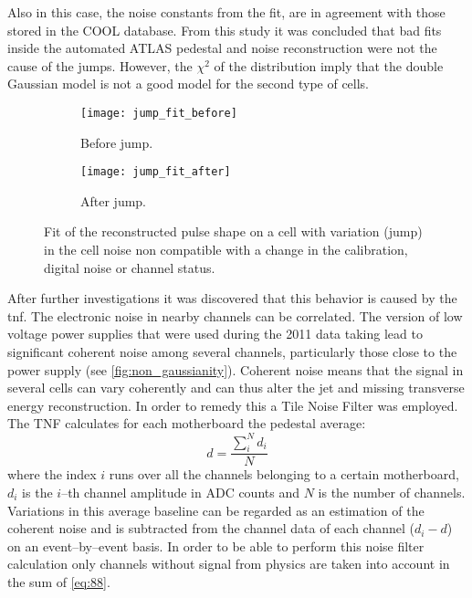 Also in this case, the noise constants from the fit, are in agreement with those
stored in the COOL database. From this study it was concluded that bad fits
inside the automated ATLAS pedestal and noise reconstruction were not the cause
of the jumps. However, the $\chi^2$ of the distribution imply that the double
Gaussian model is not a good model for the second type of cells.
\begin{figure}[!h]
  \centering
  \begin{subfigure}[t]{.8\linewidth}
    \texttt{[image: jump\_fit\_before]}
    \caption{Before jump.}
    \label{fig:jump_fit_before}
  \end{subfigure}

  \begin{subfigure}[t]{.8\linewidth}
    \texttt{[image: jump\_fit\_after]}
    \caption{After jump.}
    \label{fig:jump_fit_after}
  \end{subfigure}
  \caption{Fit of the reconstructed pulse shape on a cell with variation (jump)
    in the cell noise non compatible with a change in the calibration, digital
    noise or channel status.}
  \label{fig:jump_fit}
\end{figure}

After further investigations it was discovered that this behavior is caused by
the \gls{tnf}. The electronic noise in nearby channels can be correlated. The
version of low voltage power supplies that were used during the 2011 data taking
lead to significant coherent noise among several channels, particularly those
close to the power supply (see \cref{fig:non_gaussianity}). Coherent noise means
that the signal in several cells can vary coherently and can thus alter the jet
and missing transverse energy reconstruction. In order to remedy this a Tile
Noise Filter was employed. The TNF calculates for each motherboard the pedestal
average:
\begin{equation}
  \label{eq:88}
  d = \frac{\sum_i^N d_i}{N}
\end{equation}
where the index $i$ runs over all the channels belonging to a certain
motherboard, $d_i$ is the $i$--th channel amplitude in ADC counts and $N$ is the
number of channels. Variations in this average baseline can be regarded as an
estimation of the coherent noise and is subtracted from the channel data of each
channel ($d_i - d$) on an event--by--event basis. In order to be able to perform
this noise filter calculation only channels without signal from physics are
taken into account in the sum of \cref{eq:88}.

